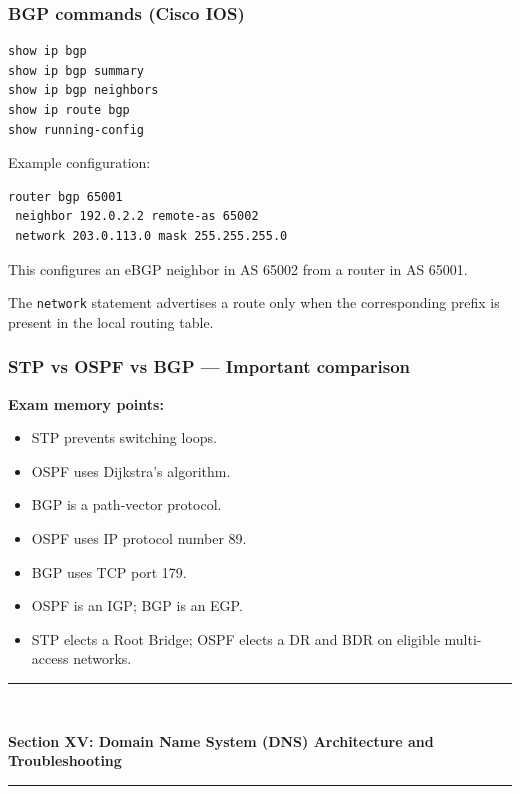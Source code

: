 \subsubsection{BGP commands (Cisco IOS)}

\begin{lstlisting}
show ip bgp
show ip bgp summary
show ip bgp neighbors
show ip route bgp
show running-config
\end{lstlisting}

Example configuration:

\begin{lstlisting}
router bgp 65001
 neighbor 192.0.2.2 remote-as 65002
 network 203.0.113.0 mask 255.255.255.0
\end{lstlisting}

This configures an eBGP neighbor in AS 65002 from a router in AS 65001.

The \texttt{network} statement advertises a route only when the corresponding prefix is present in the local routing table.

\subsubsection{STP vs OSPF vs BGP --- Important comparison}


\textbf{Exam memory points:}

\begin{itemize}
\item STP prevents switching loops.
\item OSPF uses Dijkstra's algorithm.
\item BGP is a path-vector protocol.
\item OSPF uses IP protocol number 89.
\item BGP uses TCP port 179.
\item OSPF is an IGP; BGP is an EGP.
\item STP elects a Root Bridge; OSPF elects a DR and BDR on eligible multi-access networks.
\end{itemize}


\newpage
\begin{center}
\vspace{0.5em}
{\color{primary}\rule{0.45\textwidth}{1.2pt}\\[4pt]}
{\Large\bfseries\color{primary} Section XV: Domain Name System (DNS) Architecture and Troubleshooting\\[2pt]}
{\color{primary}\rule{0.45\textwidth}{1.2pt}}
\vspace{0.5em}
\end{center}

